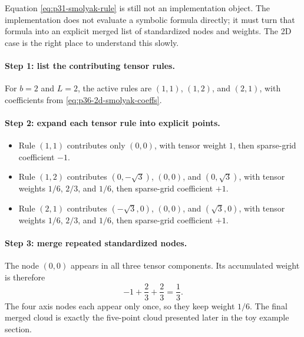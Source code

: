 \documentclass[11pt]{article}
\numberwithin{equation}{section}
\begin{document}
Equation \eqref{eq:p31-smolyak-rule} is still not an implementation object.
The implementation does not evaluate a symbolic formula directly; it must turn
that formula into an explicit merged list of standardized nodes and weights.
The 2D case is the right place to understand this slowly.

\paragraph{Step 1: list the contributing tensor rules.}
For \(b=2\) and \(L=2\), the active rules are \((1,1)\), \((1,2)\), and
\((2,1)\), with coefficients from \eqref{eq:p36-2d-smolyak-coeffs}.

\paragraph{Step 2: expand each tensor rule into explicit points.}
\begin{itemize}[leftmargin=0.28in]
  \item Rule \((1,1)\) contributes only \((0,0)\), with tensor weight \(1\),
  then sparse-grid coefficient \(-1\).
  \item Rule \((1,2)\) contributes
  \((0,-\sqrt3)\), \((0,0)\), and \((0,\sqrt3)\), with tensor weights
  \(1/6\), \(2/3\), and \(1/6\), then sparse-grid coefficient \(+1\).
  \item Rule \((2,1)\) contributes
  \((-\sqrt3,0)\), \((0,0)\), and \((\sqrt3,0)\), with tensor weights
  \(1/6\), \(2/3\), and \(1/6\), then sparse-grid coefficient \(+1\).
\end{itemize}

\paragraph{Step 3: merge repeated standardized nodes.}
The node \((0,0)\) appears in all three tensor components.  Its accumulated
weight is therefore
\begin{equation}
  -1 + \frac23 + \frac23 = \frac13.
  \label{eq:p36-origin-merge}
\end{equation}
The four axis nodes each appear only once, so they keep weight \(1/6\).
The final merged cloud is exactly the five-point cloud presented later in the toy
example section.
\end{document}
